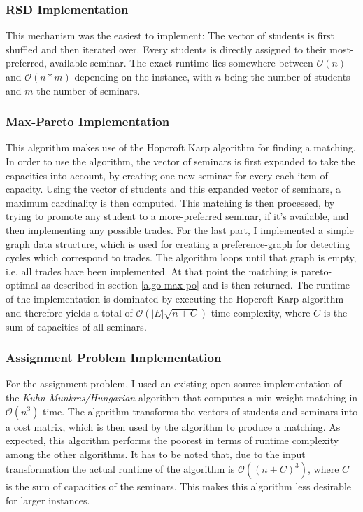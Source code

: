 \subsubsection{RSD Implementation}
This mechanism was the easiest to implement: The vector of students is first shuffled and then iterated over. Every students is directly assigned to their most-preferred, available seminar. The exact runtime lies somewhere between $\mathcal{O}(n)$ and $\mathcal{O}(n * m)$ depending on the instance, with $n$ being the number of students and $m$ the number of seminars.

\subsubsection{Max-Pareto Implementation}\label{impl:maxpo}
This algorithm makes use of the Hopcroft Karp algorithm for finding a matching. In order to use the algorithm, the vector of seminars is first expanded to take the capacities into account, by creating one new seminar for every each item of capacity. Using the vector of students and this expanded vector of seminars, a maximum cardinality is then computed. This matching is then processed, by trying to promote any student to a more-preferred seminar, if it's available, and then implementing any possible trades. For the last part, I implemented a simple graph data structure, which is used for creating a preference-graph for detecting cycles which correspond to trades. The algorithm loops until that graph is empty, i.e. all trades have been implemented. At that point the matching is pareto-optimal as described in section \ref{algo-max-po} and is then returned. The runtime of the implementation is dominated by executing the Hopcroft-Karp algorithm and therefore yields a total of $\mathcal{O}(|E|\sqrt{n+C})$ time complexity, where $C$ is the sum of capacities of all seminars.

\subsubsection{Assignment Problem Implementation}
For the assignment problem, I used an existing open-source implementation of the \textit{Kuhn-Munkres/Hungarian} algorithm that computes a min-weight matching in $\mathcal{O}(n^3)$ time\cite{HungarianGithub}. The algorithm transforms the vectors of students and seminars into a cost matrix, which is then used by the algorithm to produce a matching. As expected, this algorithm performs the poorest in terms of runtime complexity among the other algorithms. It has to be noted that, due to the input transformation the actual runtime of the algorithm is $\mathcal{O}((n + C)^3)$, where $C$ is the sum of capacities of the seminars. This makes this algorithm less desirable for larger instances.

